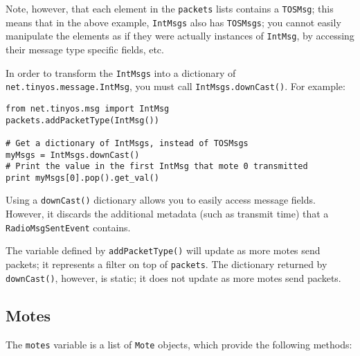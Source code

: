 \documentclass[10pt]{article}
\begin{document}
Note, however, that each element in the {\tt packets} lists
contains a {\tt TOSMsg};
this means that in the above example, {\tt IntMsgs} also has {\tt TOSMsgs};
you cannot easily manipulate the elements as if they were actually instances
of {\tt IntMsg}, by accessing their message type specific fields, etc. 

In order to transform the {\tt IntMsgs} into a dictionary of
{\tt net.tinyos.message.IntMsg}, you must call {\tt IntMsgs.downCast()}.
For example:

\begin{verbatim}
from net.tinyos.msg import IntMsg
packets.addPacketType(IntMsg())

# Get a dictionary of IntMsgs, instead of TOSMsgs
myMsgs = IntMsgs.downCast()
# Print the value in the first IntMsg that mote 0 transmitted
print myMsgs[0].pop().get_val()
\end{verbatim}

Using a {\tt downCast()} dictionary allows you to easily access
message fields. However, it discards the additional metadata (such as
transmit time) that a {\tt RadioMsgSentEvent} contains.

The variable defined by {\tt addPacketType()} will update as more
motes send packets; it represents a filter on top of {\tt packets}. 
The dictionary returned by {\tt downCast()}, however, is static;
it does not update as more motes send packets.

\subsection{Motes}
\label{sec:motes}

The {\tt motes} variable is a list of {\tt Mote} objects, which
provide the following methods:
\end{document}
